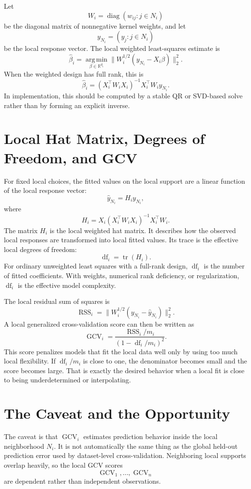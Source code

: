 \documentclass[11pt]{article}
\newcommand{\R}{\mathbb{R}}
\newcommand{\GCV}{\operatorname{GCV}}
\newcommand{\RSS}{\operatorname{RSS}}
\newcommand{\df}{\operatorname{df}}
\newcommand{\tr}{\operatorname{tr}}
\newcommand{\argmin}{\operatorname*{arg\,min}}
\begin{document}
Let
\[
  W_i = \operatorname{diag}(w_{ij}: j\in N_i)
\]
be the diagonal matrix of nonnegative kernel weights, and let
\[
  y_{N_i} = (y_j:j\in N_i)
\]
be the local response vector.  The local weighted least-squares estimate is
\[
  \widehat\beta_i
  =
  \argmin_{\beta\in\R^{q_i}}
  \|W_i^{1/2}(y_{N_i}-X_i\beta)\|_2^2.
\]
When the weighted design has full rank, this is
\[
  \widehat\beta_i
  =
  (X_i^\top W_i X_i)^{-1}X_i^\top W_i y_{N_i}.
\]
In implementation, this should be computed by a stable QR or SVD-based solve
rather than by forming an explicit inverse.

\section{Local Hat Matrix, Degrees of Freedom, and GCV}

For fixed local choices, the fitted values on the local support are a linear
function of the local response vector:
\[
  \widehat y_{N_i}
  =
  H_i y_{N_i},
\]
where
\[
  H_i
  =
  X_i(X_i^\top W_iX_i)^{-1}X_i^\top W_i.
\]
The matrix \(H_i\) is the local weighted hat matrix.  It describes how the
observed local responses are transformed into local fitted values.  Its trace
is the effective local degrees of freedom:
\[
  \df_i = \tr(H_i).
\]
For ordinary unweighted least squares with a full-rank design, \(\df_i\) is the
number of fitted coefficients.  With weights, numerical rank deficiency, or
regularization, \(\df_i\) is the effective model complexity.

The local residual sum of squares is
\[
  \RSS_i
  =
  \|W_i^{1/2}(y_{N_i}-\widehat y_{N_i})\|_2^2.
\]
A local generalized cross-validation score can then be written as
\[
  \GCV_i
  =
  \frac{\RSS_i/m_i}{(1-\df_i/m_i)^2}.
\]
This score penalizes models that fit the local data well only by using too much
local flexibility.  If \(\df_i/m_i\) is close to one, the denominator becomes
small and the score becomes large.  That is exactly the desired behavior when a
local fit is close to being underdetermined or interpolating.

\section{The Caveat and the Opportunity}

The caveat is that \(\GCV_i\) estimates prediction behavior inside the local
neighborhood \(N_i\).  It is not automatically the same thing as the global
held-out prediction error used by dataset-level cross-validation.  Neighboring
local supports overlap heavily, so the local GCV scores
\[
  \GCV_1,\ldots,\GCV_n
\]
are dependent rather than independent observations.
\end{document}
